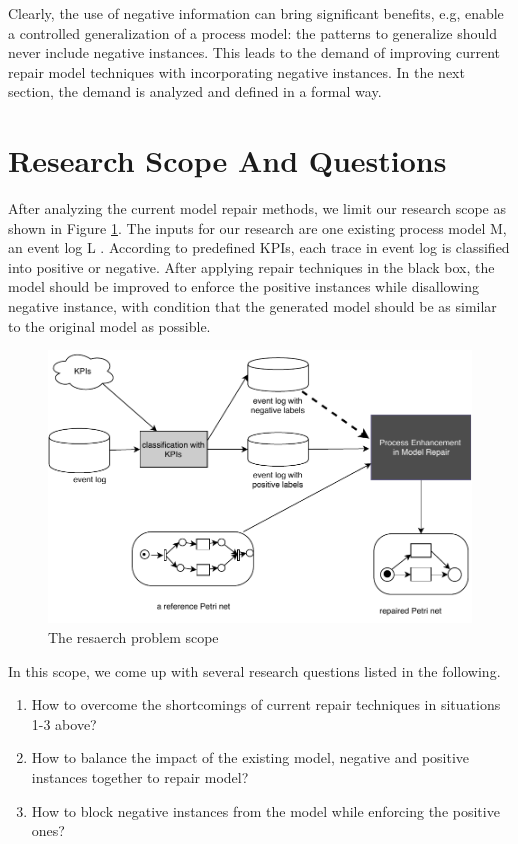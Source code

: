 Clearly, the use of negative information can bring significant benefits, e.g, enable a controlled generalization of a process model: the patterns to generalize should never include negative instances. This leads to the demand of improving current repair model techniques with incorporating negative instances. In the next section, the demand is analyzed and defined in a formal way.

\section{Research Scope And Questions }
After analyzing the current model repair methods, we limit our research scope as shown in Figure \ref{fig:scope}.  The inputs for our research are one existing process model M, an event log L . According to predefined KPIs, each trace in event log is classified into positive or negative. After applying repair techniques in the black box, the model should be improved to enforce the positive instances while disallowing negative instance, with condition that the generated model should be as similar to the original model as possible. 
\begin{figure}
	\centering
	\includegraphics[width=\textwidth]{figures/introduction/P06-problem-scope.pdf}
	\caption{The resaerch problem scope}
	\label{fig:scope}
\end{figure}

In this scope, we come up with several research questions listed in the following.
\begin{enumerate}[start=1,label={\bfseries{ RQ\arabic*:}}]
	\item How to overcome the shortcomings of current repair techniques in situations 1-3 above?
	\item How to balance the impact of the existing model, negative and positive instances together to repair model? 
	\item How to block negative instances from the model while enforcing the positive ones?
\end{enumerate}
  
